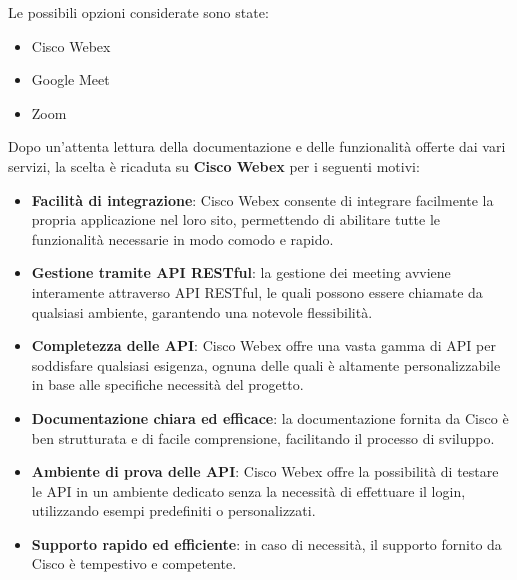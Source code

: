 Le possibili opzioni considerate sono state:
\begin{itemize}
    \item Cisco Webex
    \item Google Meet
    \item Zoom
\end{itemize}
Dopo un'attenta lettura della documentazione e delle funzionalità offerte dai vari servizi,
la scelta è ricaduta su \textbf{Cisco Webex} per i seguenti motivi:
\begin{itemize}

    \item \textbf{Facilità di integrazione}: Cisco Webex consente di integrare facilmente la propria applicazione nel loro sito, 
    permettendo di abilitare tutte le funzionalità necessarie in modo comodo e rapido.

    \item \textbf{Gestione tramite API RESTful}: la gestione dei meeting avviene interamente attraverso API RESTful, 
    le quali possono essere chiamate da qualsiasi ambiente, garantendo una notevole flessibilità.

    \item \textbf{Completezza delle API}: Cisco Webex offre una vasta gamma di API per soddisfare qualsiasi esigenza, 
    ognuna delle quali è altamente personalizzabile in base alle specifiche necessità del progetto.

    \item \textbf{Documentazione chiara ed efficace}: la documentazione fornita da Cisco è ben strutturata e di facile comprensione, facilitando il processo di sviluppo.
    
    \item \textbf{Ambiente di prova delle API}: Cisco Webex offre la possibilità di testare le API in un ambiente dedicato senza la necessità di effettuare il login, utilizzando esempi predefiniti o personalizzati.

    \item \textbf{Supporto rapido ed efficiente}: in caso di necessità, il supporto fornito da Cisco è tempestivo e competente.
\end{itemize}
